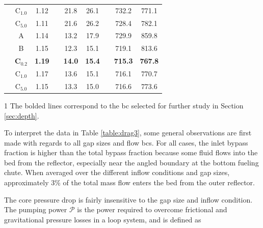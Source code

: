 \begin{table}[htb!]
\begin{threeparttable}
\begin{tabular}{@{}c c c c c c c c c @{}}
& C$_{1.0}$ & 1.12 && 21.8 & 26.1 && 732.2 & 771.1\\ %
& C$_{5.0}$ & 1.11 && 21.6 & 26.2 && 728.4 & 782.1\\ %
\rule{0pt}{4ex} 
\multirow{5}{*}{axial} & A & 1.14 && 13.2 & 17.9 && 729.9 & 859.8\\ %
& B & 1.15 && 12.3 & 15.1 && 719.1 & 813.6\\
& \textbf{C$_{0.2}$} & \textbf{1.19} && \textbf{14.0} & \textbf{15.4} && \textbf{715.3} & \textbf{767.8}\\
& C$_{1.0}$ & 1.17 && 13.6 & 15.1 && 716.1 & 770.7\\
& C$_{5.0}$ & 1.15 && 13.3 & 15.0 && 716.6 & 773.6\\
\bottomrule
\end{tabular}
\begin{tablenotes}
\item[1]\small The bolded lines correspond to the \gls{bc} selected for further study in Section \ref{sec:depth}.
\end{tablenotes}
\end{threeparttable}
\end{table}

To interpret the data in Table \ref{table:drag3}, some general observations are first made with regards to all gap sizes and flow \glspl{bc}. For all cases, the inlet bypass fraction is higher than the total bypass fraction because some fluid flows into the bed from the reflector, especially near the angled boundary at the bottom fueling chute. When averaged over the different inflow conditions and gap sizes, approximately 3\% of the total mass flow enters the bed from the outer reflector. 

The core pressure drop is fairly insensitive to the gap size and inflow condition. The pumping power \(\mathcal{P}\) is the power required to overcome frictional and gravitational pressure losses in a loop system, and is defined as


